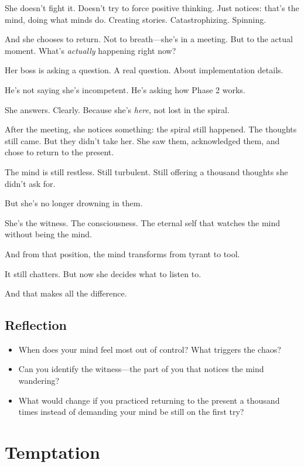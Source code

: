 \documentclass[11pt,twoside]{book}
\begin{document}
She doesn't fight it. Doesn't try to force positive thinking. Just notices: that's the mind, doing what minds do. Creating stories. Catastrophizing. Spinning.

And she chooses to return. Not to breath—she's in a meeting. But to the actual moment. What's \emph{actually} happening right now?

Her boss is asking a question. A real question. About implementation details.

He's not saying she's incompetent. He's asking how Phase 2 works.

She answers. Clearly. Because she's \emph{here}, not lost in the spiral.

After the meeting, she notices something: the spiral still happened. The thoughts still came. But they didn't take her. She saw them, acknowledged them, and chose to return to the present.

The mind is still restless. Still turbulent. Still offering a thousand thoughts she didn't ask for.

But she's no longer drowning in them.

She's the witness. The consciousness. The eternal self that watches the mind without being the mind.

And from that position, the mind transforms from tyrant to tool.

It still chatters. But now she decides what to listen to.

And that makes all the difference.

\section*{Reflection}

\begin{itemize}
\item When does your mind feel most out of control? What triggers the chaos?
\item Can you identify the witness—the part of you that notices the mind wandering?
\item What would change if you practiced returning to the present a thousand times instead of demanding your mind be still on the first try?
\end{itemize}

\chapter{Temptation}
\end{document}
